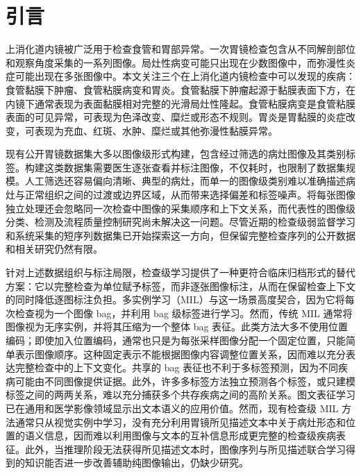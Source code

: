 \documentclass[Afour,sagev,times]{sagej}
\makeatletter
\def\keywords#1{%
  \gdef\@keywords{\begin{minipage}{\textwidth}{\normalsize\sagesf \textbf{关键词}}\\ \parbox[t]{\textwidth}{#1}\end{minipage}}}
\makeatother
\begin{document}
\keywords{胃镜检查，检查级多标签分类，多实例学习，多模态学习，采集感知位置编码，知识蒸馏}

\maketitle


\section{引言}

上消化道内镜被广泛用于检查食管和胃部异常。一次胃镜检查包含从不同解剖部位和观察角度采集的一系列图像。局灶性病变可能只出现在少数图像中，而弥漫性炎症可能出现在多张图像中。本文关注三个在上消化道内镜检查中可以发现的疾病：食管黏膜下肿瘤、食管粘膜病变和胃炎。食管黏膜下肿瘤起源于黏膜表面下方，在内镜下通常表现为表面黏膜相对完整的光滑局灶性隆起。食管粘膜病变是食管粘膜表面的可见异常，可表现为色泽改变、糜烂或形态不规则。胃炎是胃黏膜的炎症改变，可表现为充血、红斑、水肿、糜烂或其他弥漫性黏膜异常。

现有公开胃镜数据集大多以图像级形式构建，包含经过筛选的病灶图像及其类别标签。构建这类数据集需要医生逐张查看并标注图像，不仅耗时，也限制了数据集规模。人工筛选还容易偏向清晰、典型的病灶，而单一的图像级类别难以准确描述病灶与正常组织之间的过渡或边界区域，从而带来选择偏差和标签噪声。将每张图像独立处理还会忽略同一次检查中图像的采集顺序和上下文关系，而代表性的图像级分类、检测及流程质量控制研究尚未解决这一问题。尽管近期的检查级弱监督学习和系统采集的短序列数据集已开始探索这一方向，但保留完整检查序列的公开数据和相关研究仍然有限。

针对上述数据组织与标注局限，检查级学习提供了一种更符合临床归档形式的替代方案：它以完整检查为单位赋予标签，而非逐张图像标注，从而在保留检查上下文的同时降低逐图标注负担。多实例学习（MIL）与这一场景高度契合，因为它将每次检查视为一个图像 bag，并利用 bag 级标签进行学习。然而，传统 MIL 通常将图像视为无序实例，并将其压缩为一个整体 bag 表征。此类方法大多不使用位置编码；即使加入位置编码，通常也只是为每张采样图像分配一个固定位置，只能简单表示图像顺序。这种固定表示不能根据图像内容调整位置关系，因而难以充分表达完整检查中的上下文变化。共享的 bag 表征也不利于多标签预测，因为不同疾病可能由不同图像提供证据。此外，许多多标签方法独立预测各个标签，或只建模标签之间的两两关系，难以充分捕获多个共存疾病之间的高阶关系。图文表征学习已在通用和医学影像领域显示出文本语义的应用价值。然而，现有检查级 MIL 方法通常只从视觉实例中学习，没有充分利用胃镜所见描述文本中关于病灶形态和位置的语义信息，因而难以利用图像与文本的互补信息形成更完整的检查级疾病表征。此外，当推理阶段无法获得所见描述文本时，图像序列与所见描述联合学习得到的知识能否进一步改善辅助纯图像输出，仍缺少研究。
\end{document}
